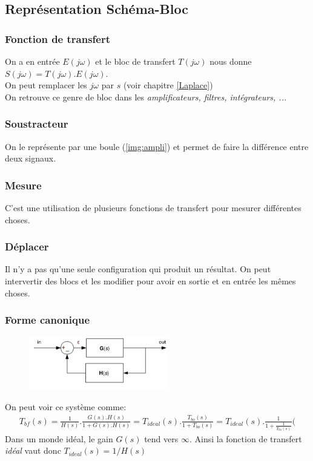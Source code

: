 \documentclass{report}
\begin{document}
\subsection{Représentation Schéma-Bloc}

\subsubsection{Fonction de transfert}
On a en entrée $E(j\omega)$ et le bloc de transfert $T(j\omega)$ nous donne $S(j\omega) = T(j\omega) . E(j\omega)$.\\
On peut remplacer les $j \omega$ par $s$ (voir chapitre \ref{Laplace})\\
On retrouve ce genre de bloc dans les \textit{amplificateurs, filtres, intégrateurs, ...}

\subsubsection{Soustracteur} 
On le représente par une boule (\ref{img:ampli}) et permet de faire la différence entre deux signaux.

\subsubsection{Mesure}
C'est une utilisation de plusieurs fonctions de transfert pour mesurer différentes choses.

\subsubsection{Déplacer}
Il n'y a pas qu'une seule configuration qui produit un résultat. On peut intervertir des blocs et les modifier pour avoir en sortie et en entrée les mêmes choses.

\subsubsection{Forme canonique}
\begin{figure}[H]
\centering
\includegraphics[width=6cm]{img/Bloc2.png}
\end{figure}
On peut voir ce système comme:
\begin{align*}
T_{bf}(s) = \frac{1}{H(s)}.\frac{G(s) . H(s)}{1 + G(s). H(s)} = T_{ideal} (s) . \frac{T_{bo}(s)}{1+T_{bo}(s)} = T_{ideal} (s) . \frac{1}{1 + \frac{1}{T_{bo}(s)}}(
\end{align*}
Dans un monde idéal, le gain $G(s)$ tend vers $\infty$. Ainsi la fonction de transfert \textit{idéal} vaut donc $T_{ideal}(s) = 1/H(s)$
\end{document}
